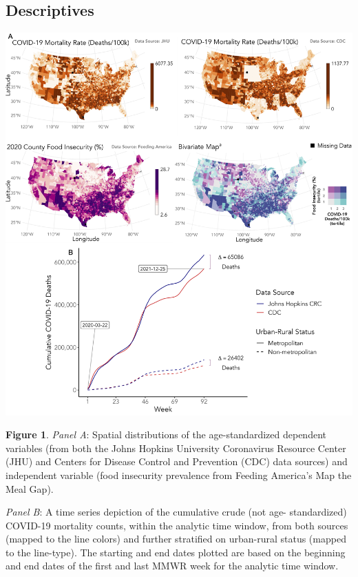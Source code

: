 \documentclass[aspectratio=169]{beamer}
\begin{document}
\subsection{Descriptives}
\begin{frame}
	\begin{minipage}{.52\textwidth}
		\hspace{-0.5cm}
		\centering
		\includegraphics[scale=0.092]{images-logos/combo-chloro-time-series.png}\\
		
		
	\end{minipage}%
	\hspace{1.65 cm}
	\begin{minipage}{.30\textwidth}
			\vspace{-0.3 cm}
		\raggedright
	\tiny{\textbf{Figure 1}. \textit{Panel A}: Spatial distributions of the age-standardized dependent variables (from both the Johns Hopkins University Coronavirus Resource Center (JHU) and Centers for Disease Control and Prevention (CDC) data sources) and independent variable (food insecurity prevalence from Feeding America’s Map the Meal Gap). \\ 
		
\vspace{0.21cm}

		\textit{Panel B}: A time series depiction of the cumulative crude (not age- standardized) COVID-19 mortality counts, within the analytic time window, from both sources (mapped to the line colors) and further stratified on urban-rural status (mapped to the line-type). The starting and end dates plotted are based on the beginning and end dates of the first and last MMWR week for the analytic time window.}
		
	\end{minipage}
\end{frame}    
\end{document}
